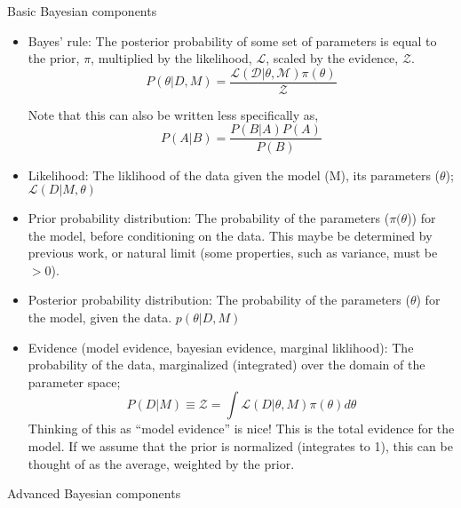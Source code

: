 \documentclass{article}
\begin{document}
Basic Bayesian components
\begin{itemize}
    \item Bayes' rule: The posterior probability of some set of parameters is equal to the prior, $\pi$, multiplied by the likelihood, $\mathcal{L}$, scaled by the evidence, $\mathcal{Z}$.
        \begin{equation}
            P(\theta | D, M) = \frac{\mathcal{L(D | \theta, M)} \pi(\theta)}{\mathcal{Z}}
        \end{equation}

        Note that this can also be written less specifically as,
        \begin{equation}
            P(A | B) = \frac{P(B | A) P(A)}{P(B)}
        \end{equation}

    \item Likelihood: The liklihood of the data given the model (M), its parameters ($\theta$); $\mathcal{L}(D | M, \theta)$
    \item Prior probability distribution: The probability of the parameters ($\pi(\theta$)) for the model, before conditioning on the data. This maybe be determined by previous work, or natural limit (some properties, such as variance, must be $> 0$).
    \item Posterior probability distribution: The probability of the parameters ($\theta$) for the model, given the data. $p(\theta | D, M)$
    \item Evidence (model evidence, bayesian evidence, marginal liklihood): The probability of the data, marginalized (integrated) over the domain of the parameter space;
        \begin{equation}
            P(D | M) \equiv \mathcal{Z} = \int \mathcal{L}(D | \theta, M) \pi(\theta) d\theta
        \end{equation}
        Thinking of this as ``model evidence'' is nice! This is the total evidence for the model.
        If we assume that the prior is normalized (integrates to 1), this can be thought of as the average, weighted by the prior.
\end{itemize}

Advanced Bayesian components
\end{document}

